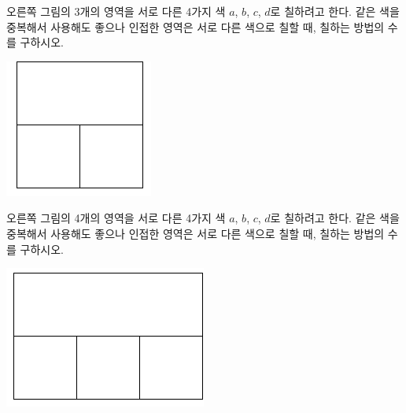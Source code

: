 \documentclass[a4paper]{oblivoir}
\begin{document}

%
\begin{minipage}{.65\textwidth}
\begin{Exercise}
오른쪽 그림의 3개의 영역을 서로 다른 4가지 색 \(a\), \(b\), \(c\), \(d\)로 칠하려고 한다.
같은 색을 중복해서 사용해도 좋으나 인접한 영역은 서로 다른 색으로 칠할 때, 칠하는 방법의 수를 구하시오.
\end{Exercise}
\end{minipage}
\quad
\begin{minipage}{.25\textwidth}
\includegraphics[width=.5\textwidth]{4}
\end{minipage}


%
\begin{minipage}{.65\textwidth}
\begin{Exercise}
오른쪽 그림의 4개의 영역을 서로 다른 4가지 색 \(a\), \(b\), \(c\), \(d\)로 칠하려고 한다.
같은 색을 중복해서 사용해도 좋으나 인접한 영역은 서로 다른 색으로 칠할 때, 칠하는 방법의 수를 구하시오.
\end{Exercise}
\end{minipage}
\quad
\begin{minipage}{.25\textwidth}
\includegraphics[width=.5\textwidth]{5}
\end{minipage}

\end{document}
